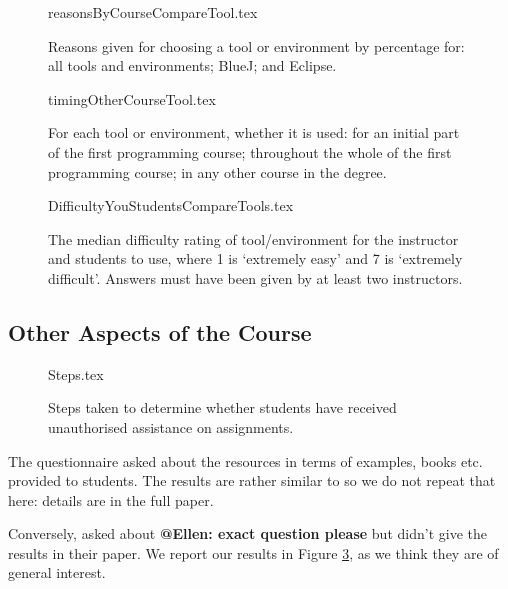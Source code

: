 \documentclass{sig-alternate}
\begin{document}
\begin{figure}
\begin{center}
{reasonsByCourseCompareTool.tex}
\end{center}
\caption{Reasons given for choosing a tool or environment by percentage for: all tools and environments; BlueJ; and Eclipse.}
\end{figure}

\begin{figure}
\begin{center}
{timingOtherCourseTool.tex}
\end{center}\vskip-18pt
\caption{For each tool or environment, whether it is used: for an initial part of the first programming course; throughout the whole of the first programming course; in any other course in the degree.\label{fig:toolreuse}}
\end{figure}


\begin{figure}
\begin{center}
{DifficultyYouStudentsCompareTools.tex}
\end{center}
\caption{The median difficulty rating of tool/environment for the instructor and students to use, where 1 is `extremely easy' and 7 is `extremely difficult'.  Answers must have been given by at least two instructors.\label{fig:toolhard}}
\end{figure}

\subsection{Other Aspects of the Course}

\begin{figure}
\begin{center}
{Steps.tex}
\end{center}\vskip-18pt
\caption{Steps taken to determine whether students have received unauthorised assistance on assignments.\label{fig:Plagiarise}}
\end{figure}

The questionnaire asked about the resources in terms of examples,
books etc. provided to students. The results are rather similar to
\cite[Figure 14]{mason+cooper:2014} so we do not repeat that here:
details are in the full paper.

Conversely, \cite{mason+cooper:2014} asked about {\bf @Ellen: exact
  question please} but didn't give the results  in their paper. We
report our results in Figure \ref{fig:Plagiarise}, as we think they
are of general interest. 
\end{document}
